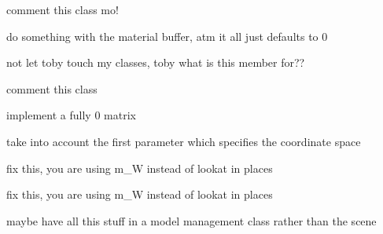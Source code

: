 
\begin{DoxyRefList}
\item[\label{todo__todo000008}%
\hypertarget{todo__todo000008}{}%
Member \hyperlink{class_float_three_node_proxy_widget_ac212c5dca46905943b440d47aef9816e}{Float\-Three\-Node\-Proxy\-Widget\-:\-:Float\-Three\-Node\-Proxy\-Widget} (\hyperlink{class_q_n_e_port}{Q\-N\-E\-Port} $\ast$\-\_\-port\-Connected, optix\-::\-Material \&\-\_\-mat, Q\-Graphics\-Item $\ast$parent=0)]comment this class mo!  
\item[\label{todo__todo000001}%
\hypertarget{todo__todo000001}{}%
Class \hyperlink{class_opti_x_model}{Opti\-X\-Model} ]do something with the material buffer, atm it all just defaults to 0  
\item[\label{todo__todo000002}%
\hypertarget{todo__todo000002}{}%
Member \hyperlink{class_opti_x_model_a4ef713de613b12da4e49a7599516b081}{Opti\-X\-Model\-:\-:m\-\_\-indices} ]not let toby touch my classes, toby what is this member for??  
\item[\label{todo__todo000009}%
\hypertarget{todo__todo000009}{}%
Class \hyperlink{class_o_s_l_var_float_three_block}{O\-S\-L\-Var\-Float\-Three\-Block} ]comment this class  
\item[\label{todo__todo000015}%
\hypertarget{todo__todo000015}{}%
Member \hyperlink{class_oso_reader_a73b356139df5730e756f2366ec1e1924}{Oso\-Reader\-:\-:generate\-Device\-Function} ()]implement a fully 0 matrix 

take into account the first parameter which specifies the coordinate space  
\item[\label{todo__todo000004}%
\hypertarget{todo__todo000004}{}%
Member \hyperlink{class_path_trace_camera_a28b8c742021899cc72760977ad864764}{Path\-Trace\-Camera\-:\-:dolly} (float \-\_\-scale)]fix this, you are using m\-\_\-\-W instead of lookat in places  
\item[\label{todo__todo000003}%
\hypertarget{todo__todo000003}{}%
Member \hyperlink{class_path_trace_camera_a96f2c8e5b33f2d2503891c4d9c431948}{Path\-Trace\-Camera\-:\-:rotate} (glm\-::mat4 \-\_\-trans)]fix this, you are using m\-\_\-\-W instead of lookat in places  
\item[\label{todo__todo000012}%
\hypertarget{todo__todo000012}{}%
Member \hyperlink{class_path_tracer_scene_ab41f55350a5a50b60381cd46120c45aa}{Path\-Tracer\-Scene\-:\-:import\-Mesh} (std\-::string \-\_\-id, std\-::string \-\_\-path)]maybe have all this stuff in a model management class rather than the scene 


\end{DoxyRefList}
